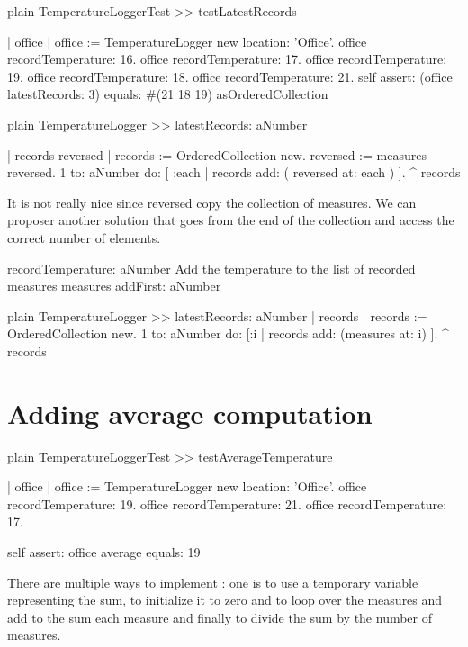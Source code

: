 \documentclass[10pt,twoside,english]{_support/latex/sbabook/sbabook}
\begin{document}
\begin{displaycode}{plain}
TemperatureLoggerTest >> testLatestRecords

    | office |
    office := TemperatureLogger new location: 'Office'.
    office recordTemperature: 16.
    office recordTemperature: 17.
    office recordTemperature: 19.
    office recordTemperature: 18.
    office recordTemperature: 21.
    self assert: (office latestRecords: 3) equals: #(21 18 19) asOrderedCollection
\end{displaycode}

\begin{displaycode}{plain}
TemperatureLogger >> latestRecords: aNumber

    | records reversed |
    records := OrderedCollection new.
    reversed := measures reversed.
    1 to: aNumber do: [ :each |
            records add: ( reversed at: each ) ].
    ^ records
\end{displaycode}

It is not really nice since reversed copy the collection of measures. 
We can proposer another solution that goes from the end of the collection and 
access the correct number of elements.

recordTemperature: aNumber
    Add the temperature to the list of recorded measures
    measures addFirst: aNumber

\begin{displaycode}{plain}
TemperatureLogger >> latestRecords: aNumber
    | records |
    records := OrderedCollection new.
    1 to: aNumber do: [:i | records add: (measures at: i)  ].
    ^ records
\end{displaycode}
\section{Adding average computation}
\begin{displaycode}{plain}
TemperatureLoggerTest >> testAverageTemperature

    | office |
    office := TemperatureLogger new location: 'Office'.
    office recordTemperature: 19.
    office recordTemperature: 21.
    office recordTemperature: 17.

    self assert: office average equals: 19
\end{displaycode}

There are multiple ways to implement : one is to use a temporary variable representing the sum, to initialize it to zero and to loop over the measures and add to the sum each measure and finally to divide the sum by the number of measures.
\end{document}
